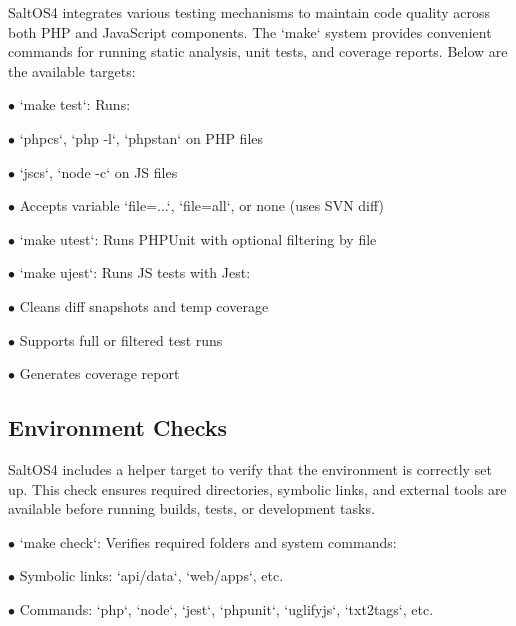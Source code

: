 \documentclass[a4paper]{article}
\begin{document}
SaltOS4 integrates various testing mechanisms to maintain code quality across both PHP and JavaScript components. The `make` system provides convenient commands for running static analysis, unit tests, and coverage reports. Below are the available targets:

\begin{compactitem}
\item[\color{myblue}$\bullet$] `make test`: Runs:
  \begin{compactitem}
  \item[\color{myblue}$\bullet$] `phpcs`, `php -l`, `phpstan` on PHP files
  \item[\color{myblue}$\bullet$] `jscs`, `node -c` on JS files
  \item[\color{myblue}$\bullet$] Accepts variable `file=...`, `file=all`, or none (uses SVN diff)
  \end{compactitem}
\item[\color{myblue}$\bullet$] `make utest`: Runs PHPUnit with optional filtering by file
\item[\color{myblue}$\bullet$] `make ujest`: Runs JS tests with Jest:
  \begin{compactitem}
  \item[\color{myblue}$\bullet$] Cleans diff snapshots and temp coverage
  \item[\color{myblue}$\bullet$] Supports full or filtered test runs
  \item[\color{myblue}$\bullet$] Generates coverage report
  \end{compactitem}
\end{compactitem}

\hypertarget{toc45}{}
\subsection{Environment Checks}

SaltOS4 includes a helper target to verify that the environment is correctly set up. This check ensures required directories, symbolic links, and external tools are available before running builds, tests, or development tasks.

\begin{compactitem}
\item[\color{myblue}$\bullet$] `make check`: Verifies required folders and system commands:
  \begin{compactitem}
  \item[\color{myblue}$\bullet$] Symbolic links: `api/data`, `web/apps`, etc.
  \item[\color{myblue}$\bullet$] Commands: `php`, `node`, `jest`, `phpunit`, `uglifyjs`, `txt2tags`, etc.
  \end{compactitem}
\end{compactitem}
\end{document}
